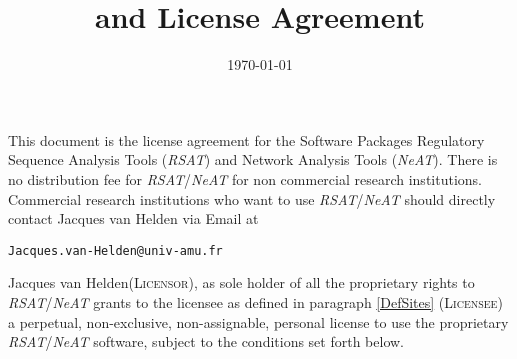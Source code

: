 \documentclass[12pt]{article}
\title{\RSAT and \NeAT License Agreement}
\author{\vspace*{-1cm}}
\date{\vspace*{-1cm}\today}
\makeatletter
\newcommand{\RSAT}[0]{\emph{RSAT}\xspace}
\newcommand{\NeAT}[0]{\emph{NeAT}\xspace}
\newcommand{\Licensorname}[0]{Jacques van Helden\xspace}
\newcommand{\Licensor}[0]{\textsc{Licensor}\xspace}
\newcommand{\Licensee}[0]{\textsc{Licensee}\xspace}
\newcommand{\JvHemail}[0]{\texttt{\small Jacques.van-Helden@univ-amu.fr}\xspace}
\makeatother
\begin{document}
\maketitle

This document is the license agreement for the Software Packages
Regulatory Sequence Analysis Tools (\RSAT) and Network Analysis Tools
(\NeAT).  There is no distribution fee for \RSAT/\NeAT for non commercial
research institutions. Commercial research institutions who want to
use \RSAT/\NeAT should directly contact Jacques van Helden via Email at
\begin{center}
\JvHemail
\end{center}

\Licensorname (\Licensor), as sole holder of all the proprietary
rights to \RSAT/\NeAT grants to the licensee as defined in paragraph
\ref{DefSites} (\Licensee) a perpetual, non-exclusive, non-assignable,
personal license to use the proprietary \RSAT/\NeAT software, subject to the
conditions set forth below.
\end{document}
